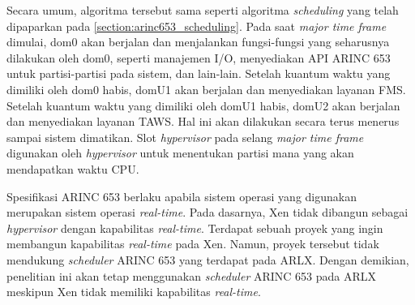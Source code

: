 Secara umum, algoritma tersebut sama seperti algoritma \textit{scheduling} yang telah dipaparkan
pada \autoref{section:arinc653_scheduling}. Pada saat \textit{major time frame} dimulai,
{dom0} akan berjalan dan menjalankan fungsi-fungsi yang seharusnya dilakukan oleh dom0,
seperti manajemen I/O, menyediakan API ARINC 653 untuk partisi-partisi pada sistem, dan
lain-lain. Setelah kuantum waktu yang dimiliki oleh dom0 habis, domU1 akan berjalan dan
menyediakan layanan FMS. Setelah  kuantum waktu yang dimiliki oleh domU1 habis, domU2 akan
berjalan dan menyediakan layanan TAWS. Hal ini akan dilakukan secara terus menerus sampai sistem
dimatikan. Slot \textit{hypervisor} pada selang \textit{major time frame} digunakan oleh
\textit{hypervisor} untuk menentukan partisi mana yang akan mendapatkan waktu CPU.

Spesifikasi ARINC 653 berlaku apabila sistem operasi yang digunakan merupakan sistem operasi
\textit{real-time}. Pada dasarnya, Xen tidak dibangun sebagai \textit{hypervisor} dengan
kapabilitas \textit{real-time}. Terdapat sebuah proyek yang ingin membangun kapabilitas
\textit{real-time} pada Xen. Namun, proyek tersebut tidak mendukung \textit{scheduler} ARINC 653
yang terdapat pada ARLX. Dengan demikian, penelitian ini akan tetap menggunakan
\textit{scheduler} ARINC 653 pada ARLX meskipun Xen tidak memiliki kapabilitas
\textit{real-time}.

